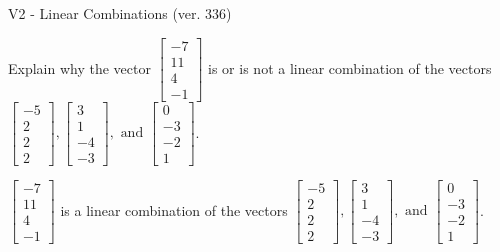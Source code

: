 \begin{exercise}
  \begin{exerciseTitle}V2 - Linear Combinations (ver. 336)\end{exerciseTitle}
  \begin{exerciseStatement}
    Explain why the vector \(\left[\begin{array}{c}
-7 \\
11 \\
4 \\
-1
\end{array}\right]\)  is or is not a linear 
	combination of the vectors \(\left[\begin{array}{c}
-5 \\
2 \\
2 \\
2
\end{array}\right] , \left[\begin{array}{c}
3 \\
1 \\
-4 \\
-3
\end{array}\right] , \text{ and } \left[\begin{array}{c}
0 \\
-3 \\
-2 \\
1
\end{array}\right]\).
	


  \end{exerciseStatement}
  \begin{exerciseAnswer}
   \(\left[\begin{array}{c}
-7 \\
11 \\
4 \\
-1
\end{array}\right]\) 
  	 is  
	a linear combination of the vectors \(\left[\begin{array}{c}
-5 \\
2 \\
2 \\
2
\end{array}\right] , \left[\begin{array}{c}
3 \\
1 \\
-4 \\
-3
\end{array}\right] , \text{ and } \left[\begin{array}{c}
0 \\
-3 \\
-2 \\
1
\end{array}\right]\).

	
  


  \end{exerciseAnswer}
\end{exercise}